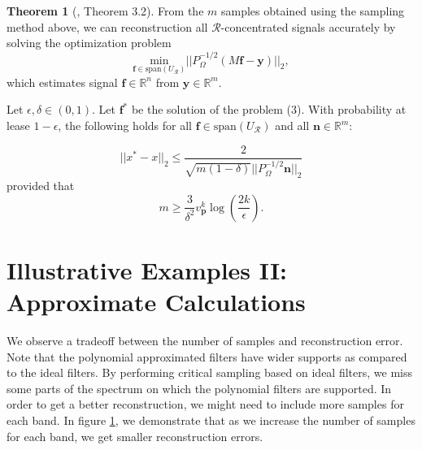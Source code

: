 \documentclass[a4paper]{article}
\newcommand{\R}{\mathcal{R}}
\newcommand{\RR}{\mathbb{R}}
\newcommand{\UR}{U_{\mathcal{R}}}
\newcommand{\vv}{\mathit{v}}
\theoremstyle{definition}
\newtheorem*{thm}{Theorem}
\begin{document}
\begin{thm}[\cite{puy}, Theorem 3.2]
\medskip

From the $m$ samples obtained using the sampling method above, we can reconstruction all $\R$-concentrated signals accurately by solving the optimization problem 
\[\underset{\bm{f} \in \text{span}(\UR)}{\text{min}}\vert\vert P^{-1/2}_\Omega (M\bm{f}-\bm{y})\vert\vert_2, \tag{3}\] 
which estimates signal $\bm{f} \in \RR^n$ from $\bm{y} \in \RR^m$. 

Let $\epsilon, \delta \in (0,1)$. Let $\bm{f^*}$ be the solution of the problem (3). With probability at lease $1-\epsilon$, the following holds for all $\bm{f}\in \text{span}(U_{\R})$ and all $\bm{n}\in \RR^m: $

\[||x^* - x||_2 \leq \frac{2}{\sqrt{m(1-\delta)} ||P_{\Omega}^{-1/2} \bm{n}||_2} \tag{4}\]
provided that \[m \geq \frac{3}{\delta^2}\vv^k_{\bm{p}}\log(\frac{2k}{\epsilon}). \tag{5} \]

\end{thm}

\section{Illustrative Examples II: Approximate Calculations}

We observe a tradeoff between the number of samples and reconstruction error. Note that the polynomial approximated filters have wider supports as compared to the ideal filters. By performing critical sampling based on ideal filters, we miss some parts of the spectrum on which the polynomial filters are supported. In order to get a better reconstruction, we might need to include more samples for each band. In figure \ref{}, we demonstrate that as we increase the number of samples for each band, we get smaller reconstruction errors.
\end{document}

